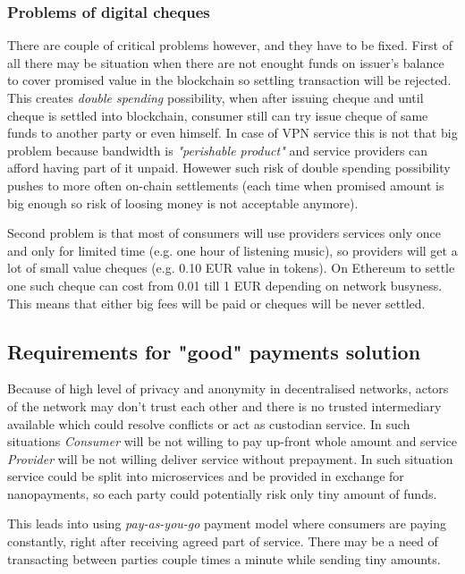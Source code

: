 \documentclass[a4paper,12pt]{article}
\begin{document}
\subsubsection{Problems of digital cheques}

There are couple of critical problems however, and they have to be fixed. First 
of all there may be situation when there are not enought funds on issuer's 
balance to cover promised value in the blockchain so settling transaction will 
be rejected. This creates \textit{double spending} possibility, when after 
issuing cheque and until cheque is settled into blockchain, consumer still can 
try issue cheque of same funds to another party or even himself. In case of VPN 
service this is not that big problem because bandwidth is \textit{"perishable 
product"} and service providers can afford having part of it unpaid. Howewer 
such risk of double spending possibility pushes to more often on-chain 
settlements (each time when promised amount is big enough so risk of loosing 
money is not acceptable anymore).

Second problem is that most of consumers will use providers services only once 
and only for limited time (e.g. one hour of listening music), so providers will 
get a lot of small value cheques (e.g. 0.10 EUR value in tokens). On Ethereum 
to settle one such cheque can cost from 0.01 till 1 EUR depending on network 
busyness. This means that either big fees will be paid or cheques will be never 
settled.

\subsection{Requirements for "good" payments solution}

Because of high level of privacy and anonymity in decentralised networks, actors
of the network may don’t trust each other and there is no trusted intermediary 
available which could resolve conflicts or act as custodian service. In such 
situations \textit{Consumer} will be not willing to pay up-front whole amount 
and service \textit{Provider} will be not willing deliver service without 
prepayment. In such situation service could be split into microservices and be 
provided in exchange for nanopayments, so each party could potentially risk only 
tiny amount of funds. 

This leads into using \textit{pay-as-you-go} payment model where consumers are 
paying constantly, right after receiving agreed part of service. There may be a 
need of transacting between parties couple times a minute while sending tiny 
amounts.
\end{document}
